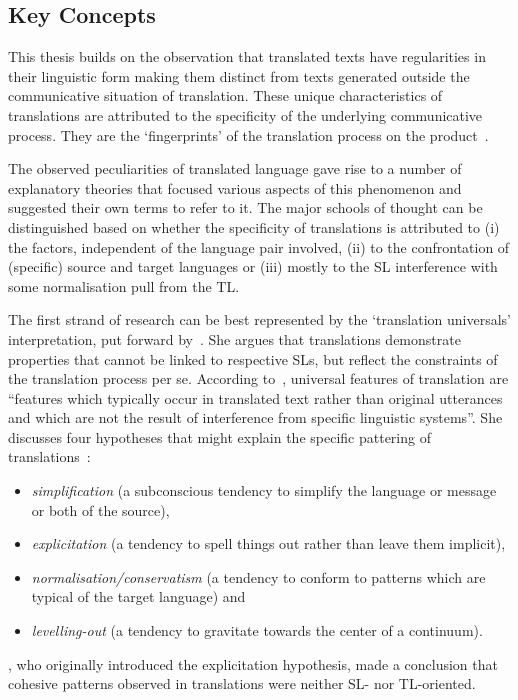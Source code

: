 \subsection{\label{ssec:keyterms}Key Concepts}
This thesis builds on the observation that translated texts have regularities in their linguistic form making them distinct from texts generated outside the communicative situation of translation. These unique characteristics of translations are attributed to the specificity of the underlying communicative process. They are the `fingerprints' of the translation process on the product~\cite{Gellerstam1986}.

\label{pg:three_strands_in_translationese_studies}
The observed peculiarities of translated language gave rise to a number of explanatory theories that focused various aspects of this phenomenon and suggested their own terms to refer to it. The major schools of thought can be distinguished based on whether the specificity of translations is attributed to (i) the factors, independent of the language pair involved, (ii) to the confrontation of (specific) source and target languages or (iii) mostly to the SL interference with some normalisation pull from the TL. 

The first strand of research can be best represented by the `translation universals' interpretation, put forward by~\citet{Baker1993}. She argues that translations demonstrate properties that cannot be linked to respective SLs, but reflect the constraints of the translation process per se. According to~\citet[p.243]{Baker1993}, universal features of translation are ``features which typically occur in translated text rather than original utterances and which are not the result of interference from specific linguistic systems''. She discusses four hypotheses that might explain the specific pattering of translations~\cite[pp.176--177, 183--184]{Baker1996}: 
\label{pg:major_trends}
\begin{itemize}\compresslist{}
	\item \textit{simplification} (a subconscious tendency to simplify the language or message or both of the source),
	\item \textit{explicitation} (a tendency to spell things out rather than leave them implicit), 
	\item \textit{normalisation/conservatism} (a tendency to conform to patterns which are typical of the target language) and
	\item \textit{levelling-out} (a tendency to gravitate towards the center of a continuum). 
\end{itemize}
\citet{BlumKulka1986}, who originally introduced the explicitation hypothesis, made a conclusion that cohesive patterns observed in translations were neither SL- nor TL-oriented. 

